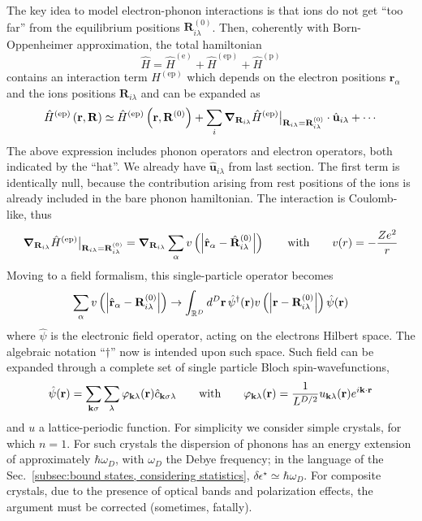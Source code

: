 The key idea to model electron-phonon interactions is that ions do not get ``too far'' from the equilibrium positions $\mathbf{R}_{i\lambda}^{(0)}$. Then, coherently with Born-Oppenheimer approximation, the total hamiltonian
\[
	\hat H = \hat H^{(\mathrm{e})} + \hat H^{(\mathrm{ep})} + \hat H^{(\mathrm{p})}
\]
contains an interaction term $H^{(\mathrm{ep})}$ which depends on the electron positions $\mathbf{r}_\alpha$ and the ions positions $\mathbf{R}_{i\lambda}$ and can be expanded as
\[
	\hat H^{(\mathrm{ep})} \left({\mathbf{r},\mathbf{R}}\right) \simeq \hat H^{(\mathrm{ep})} \left({\mathbf{r},\mathbf{R}^{(0)}}\right) + \sum_i \grad_{\mathbf{R}_{i\lambda}} \hat{H}^{(\mathrm{ep})} \big|_{\mathbf{R}_{i\lambda} = \mathbf{R}_{i\lambda}^{(0)}} \cdot \hat{\mathbf{u}}_{i\lambda} + \cdots
\]
The above expression includes phonon operators and electron operators, both indicated by the ``hat''. We already have $\hat{\mathbf{u}}_{i\lambda}$ from last section. The first term is identically null, because the contribution arising from rest positions of the ions is already included in the bare phonon hamiltonian. The interaction is Coulomb-like, thus
\[
	\grad_{\mathbf{R}_{i\lambda}} \hat{H}^{(\mathrm{ep})}\big|_{\mathbf{R}_{i\lambda} = \mathbf{R}_{i\lambda}^{(0)}} = \grad_{\mathbf{R}_{i\lambda}} \sum_\alpha v \lrR{\abs{\hat{\mathbf{r}}_\alpha - \hat{\mathbf{R}}_{i\lambda}^{(0)}}}
	\quad\qq{with}\quad
	v(r) = -\frac{Ze^2}{r}	
\]
Moving to a field formalism, this single-particle operator becomes
\[
	\sum_\alpha v \left({\abs{\hat{\mathbf{r}}_\alpha - \mathbf{R}_{i\lambda}^{(0)}}}\right) \to \int_{\mathbb{R}^D} d^D \mathbf{r} \, \hat{\psi}^\dagger (\mathbf{r}) v \left({\abs{\mathbf{r} - \mathbf{R}_{i\lambda}^{(0)}}}\right) \hat{\psi} (\mathbf{r})
\]
where $\hat{\psi}$ is the electronic field operator, acting on the electrons Hilbert space. The algebraic notation ``$\dagger$'' now is intended upon such space. Such field can be expanded through a complete set of single particle Bloch spin-wavefunctions,
\[
	\hat\psi(\mathbf{r}) = \sum_{\mathbf{k}\sigma} \sum_\lambda \varphi_{\mathbf{k}\lambda}(\mathbf{r}) \hat c_{\mathbf{k}\sigma\lambda}
	\quad\qq{with}\quad
	\varphi_{\mathbf{k}\lambda}(\mathbf{r}) = \frac{1}{L^{D/2}} u_{\mathbf{k}\lambda} (\mathbf{r}) e^{i \mathbf{k} \cdot \mathbf{r}}
\]
and $u$ a lattice-periodic function.
For simplicity we consider simple crystals, for which $n=1$. For such crystals the dispersion of phonons has an energy extension of approximately $\hbar\omega_D$, with $\omega_D$ the Debye frequency; in the language of the Sec.~\ref{subsec:bound states, considering statistics}, $\delta\epsilon^\star \simeq \hbar\omega_D$. For composite crystals, due to the presence of optical bands and polarization effects, the argument must be corrected (sometimes, fatally).

